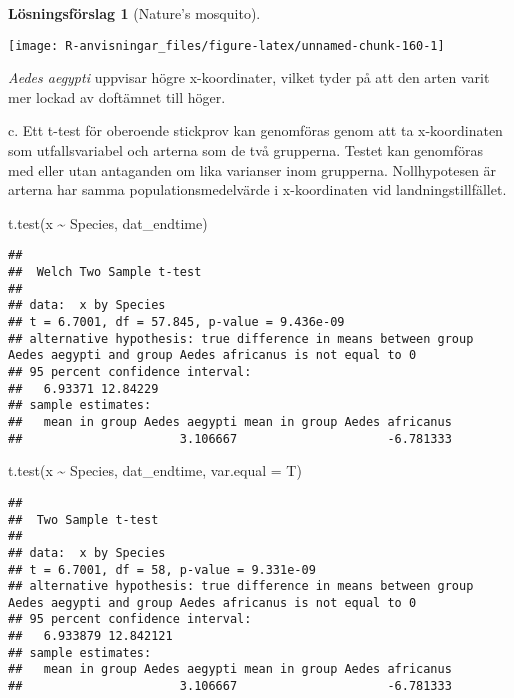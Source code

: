 \documentclass[
]{book}
\newenvironment{Shaded}{\begin{snugshade}}{\end{snugshade}}
\newcommand{\AttributeTok}[1]{\textcolor[rgb]{0.77,0.63,0.00}{#1}}
\newcommand{\FunctionTok}[1]{\textcolor[rgb]{0.00,0.00,0.00}{#1}}
\newcommand{\NormalTok}[1]{#1}
\newcommand{\SpecialCharTok}[1]{\textcolor[rgb]{0.00,0.00,0.00}{#1}}
\theoremstyle{definition}
\theoremstyle{definition}
\theoremstyle{definition}
\theoremstyle{definition}
\newtheorem{hypothesis}{Lösningsförslag}[chapter]
\theoremstyle{remark}
\begin{document}
\begin{hypothesis}[Nature's mosquito]
\begin{center}\texttt{[image: R-anvisningar\_files/figure-latex/unnamed-chunk-160-1]} \end{center}

\emph{Aedes aegypti} uppvisar högre x-koordinater, vilket tyder på att den arten varit mer lockad av doftämnet till höger.

c. Ett t-test för oberoende stickprov kan genomföras genom att ta x-koordinaten som utfallsvariabel och arterna som de två grupperna. Testet kan genomföras med eller utan antaganden om lika varianser inom grupperna. Nollhypotesen är arterna har samma populationsmedelvärde i x-koordinaten vid landningstillfället.

\begin{Shaded}
\begin{Highlighting}[]
\FunctionTok{t.test}\NormalTok{(x }\SpecialCharTok{\textasciitilde{}}\NormalTok{ Species, dat\_endtime)}
\end{Highlighting}
\end{Shaded}

\begin{verbatim}
## 
##  Welch Two Sample t-test
## 
## data:  x by Species
## t = 6.7001, df = 57.845, p-value = 9.436e-09
## alternative hypothesis: true difference in means between group Aedes aegypti and group Aedes africanus is not equal to 0
## 95 percent confidence interval:
##   6.93371 12.84229
## sample estimates:
##   mean in group Aedes aegypti mean in group Aedes africanus 
##                      3.106667                     -6.781333
\end{verbatim}

\begin{Shaded}
\begin{Highlighting}[]
\FunctionTok{t.test}\NormalTok{(x }\SpecialCharTok{\textasciitilde{}}\NormalTok{ Species, dat\_endtime, }\AttributeTok{var.equal =}\NormalTok{ T)}
\end{Highlighting}
\end{Shaded}

\begin{verbatim}
## 
##  Two Sample t-test
## 
## data:  x by Species
## t = 6.7001, df = 58, p-value = 9.331e-09
## alternative hypothesis: true difference in means between group Aedes aegypti and group Aedes africanus is not equal to 0
## 95 percent confidence interval:
##   6.933879 12.842121
## sample estimates:
##   mean in group Aedes aegypti mean in group Aedes africanus 
##                      3.106667                     -6.781333
\end{verbatim}


\end{hypothesis}
\end{document}
